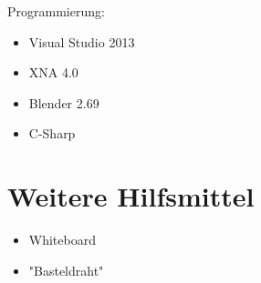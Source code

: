 Programmierung:

\begin{itemize}

\item Visual Studio 2013
\item XNA 4.0
\item Blender 2.69

\item C-Sharp

\end{itemize}


\section{Weitere Hilfsmittel}

\begin{itemize}

\item Whiteboard
\item "Basteldraht" 

\end{itemize}

